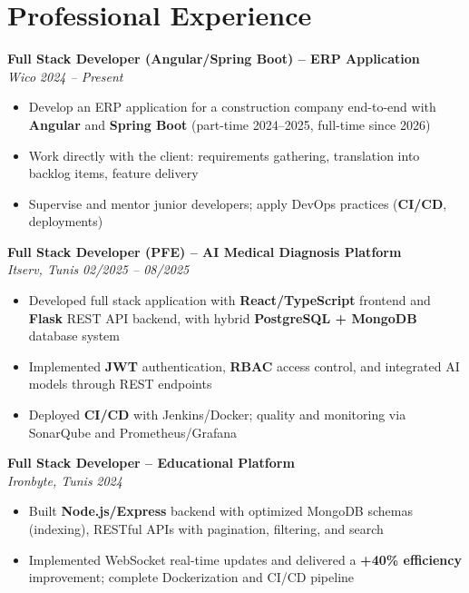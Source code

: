 \documentclass[10pt,a4paper]{article}
\begin{document}
\vspace{6pt}

\section*{Professional Experience}
{\small

\textbf{Full Stack Developer (Angular/Spring Boot) -- ERP Application}\\[1pt]
\textit{Wico} \hfill \textit{2024 -- Present}
\begin{itemize}
  \item Develop an ERP application for a construction company end-to-end with \textbf{Angular} and \textbf{Spring Boot} (part-time 2024--2025, full-time since 2026)
  \item Work directly with the client: requirements gathering, translation into backlog items, feature delivery
  \item Supervise and mentor junior developers; apply DevOps practices (\textbf{CI/CD}, deployments)
\end{itemize}

\vspace{3pt}
\textbf{Full Stack Developer (PFE) -- AI Medical Diagnosis Platform}\\[1pt]
\textit{Itserv, Tunis} \hfill \textit{02/2025 -- 08/2025}
\begin{itemize}
  \item Developed full stack application with \textbf{React/TypeScript} frontend and \textbf{Flask} REST API backend, with hybrid \textbf{PostgreSQL + MongoDB} database system
  \item Implemented \textbf{JWT} authentication, \textbf{RBAC} access control, and integrated AI models through REST endpoints
  \item Deployed \textbf{CI/CD} with Jenkins/Docker; quality and monitoring via SonarQube and Prometheus/Grafana
\end{itemize}

\vspace{3pt}
\textbf{Full Stack Developer -- Educational Platform}\\[1pt]
\textit{Ironbyte, Tunis} \hfill \textit{2024}
\begin{itemize}
  \item Built \textbf{Node.js/Express} backend with optimized MongoDB schemas (indexing), RESTful APIs with pagination, filtering, and search
  \item Implemented WebSocket real-time updates and delivered a \textbf{+40\% efficiency} improvement; complete Dockerization and CI/CD pipeline
\end{itemize}

}
\end{document}
